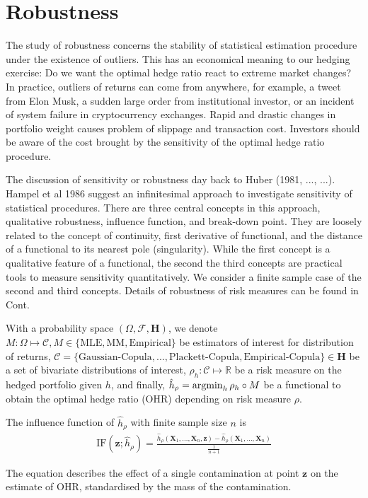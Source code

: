 \section{Robustness}\label{sec:robustness}
The study of robustness concerns the stability of statistical estimation procedure under the existence of outliers.
This has an economical meaning to our hedging exercise: Do we want the optimal hedge ratio react to extreme market changes?
In practice, outliers of returns can come from anywhere, for example, a tweet from Elon Musk, a sudden large order from
institutional investor, or an incident of system failure in cryptocurrency exchanges.
Rapid and drastic changes in portfolio weight causes problem of slippage and transaction cost.
Investors should be aware of the cost brought by the sensitivity of the optimal hedge ratio procedure.
\medskip

The discussion of sensitivity or robustness day back to Huber (1981, ..., ...).
Hampel et al 1986 suggest an infinitesimal approach to investigate sensitivity of statistical procedures.
There are three central concepts in this approach, qualitative robustness, influence function, and break-down point.
They are loosely related to the concept of continuity, first derivative of functional, and the distance of a functional to its nearest pole (singularity).
While the first concept is a qualitative feature of a functional, the second the third concepts are practical tools to measure sensitivity quantitatively.
We consider a finite sample case of the second and third concepts.
Details of robustness of risk measures can be found in Cont. \medskip

With a probability space $(\Omega, \mathscr{F}, \bm{H})$,
we denote $M: \Omega \mapsto \mathscr{C}, M \in \{\text{MLE}, \text{MM}, \text{Empirical}\}$ be estimators of interest for distribution of returns,
$\mathscr{C} = \{\text{Gaussian-Copula}, ..., \text{Plackett-Copula}, \text{Empirical-Copula}\} \in \bm{H}$ be a set of bivariate distributions of interest,
$\rho_{h}: \mathscr{C} \mapsto \mathbb{R}$ be a risk measure on the hedged portfolio given $h$,
and finally, $\hat h_\rho = \argmin_h \rho_{h} \circ M$ be a functional to obtain the optimal hedge ratio (OHR) depending on risk measure
$\rho$. \medskip

The influence function of $\hat h_\rho$ with finite sample size $n$ is
\begin{align}
    \text{IF}(\bm{z}; \hat h_\rho) = \frac{\hat h_\rho(\bm{X}_1,...,\bm{X}_n, \bm{z})-
    \hat h_\rho(\bm{X}_1,...,\bm{X}_n)}{\frac{1}{n+1}}
    \end{align}

The equation describes the effect of a single contamination at point $\bm{z}$ on the estimate of OHR,
standardised by the mass of the contamination. \medskip
